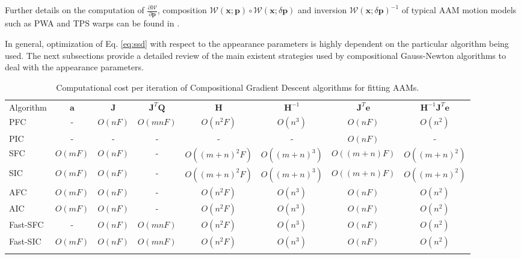 Further details on the computation of $\frac{\partial \mathcal{W}}{\partial \mathbf{p}}$, composition $\mathcal{W}(\mathbf{x}; \mathbf{p}) \circ \mathcal{W}(\mathbf{x}; \delta \mathbf{p})$ and inversion $\mathcal{W}(\mathbf{x};\delta \mathbf{p})^{-1}$ of typical AAM motion models such as PWA and TPS warps can be found in \cite{Matthews2004, Papandreou2008}.

In general, optimization of Eq. \ref{eq:ssd} with respect to the appearance parameters is highly dependent on the particular algorithm being used. The next subsections provide a detailed review of the main existent strategies used by compositional Gauss-Newton algorithms to deal with the appearance parameters.

\begin{table*}
\begin{tabular}{lccccccc}
\hline\noalign{\smallskip}
Algorithm& $\mathbf{a}$ & $\mathbf{J}$ & $\mathbf{J}^T\mathbf{Q}$ & $\mathbf{H}$ & $\mathbf{H}^{-1}$ & $\mathbf{J}^T\mathbf{e}$ & $\mathbf{H}^{-1}\mathbf{J}^T\mathbf{e}$ \\
\noalign{\smallskip}\hline\noalign{\smallskip}
PFC & - & $O(nF)$ & $O(mnF)$ & $O(n^2F)$ & $O(n^3)$ & $O(nF)$ & $O(n^2)$ \\
PIC & - & - & - & - & - & $O(nF)$ & - \\
SFC & $O(mF)$ & $O(nF)$ & - & $O((m+n)^2F)$ & $O((m+n)^3)$ & $O((m+n)F)$ & $O((m+n)^2)$ \\
SIC & $O(mF)$ & $O(nF)$ & - & $O((m+n)^2F)$ & $O((m+n)^3)$ & $O((m+n)F)$ & $O((m+n)^2)$ \\
AFC & $O(mF)$ & $O(nF)$ & - & $O(n^2F)$ & $O(n^3)$ & $O(nF)$ & $O(n^2)$ \\
AIC & $O(mF)$ & $O(nF)$ & - & $O(n^2F)$ & $O(n^3)$ & $O(nF)$ & $O(n^2)$ \\
Fast-SFC & - & $O(nF)$ & $O(mnF)$ & $O(n^2F)$ & $O(n^3)$ & $O(nF)$ & $O(n^2)$ \\
Fast-SIC &  $O(mF)$ & $O(nF)$ & $O(mnF)$ & $O(n^2F)$ & $O(n^3)$ & $O(nF)$ & $O(n^2)$ \\
\noalign{\smallskip}\hline
\end{tabular}
\caption{Computational cost per iteration of Compositional Gradient Descent algorithms for fitting AAMs.}
\label{tab:complexity}  
\end{table*}
